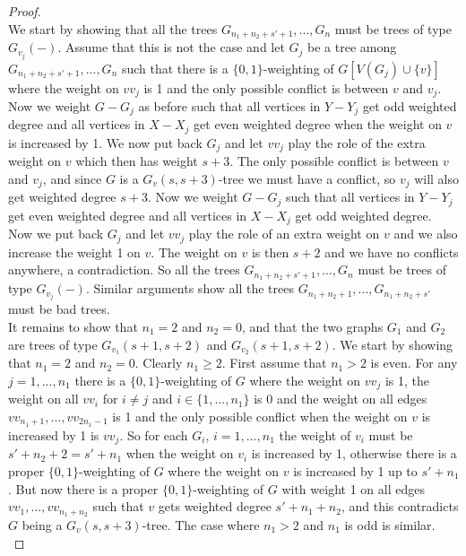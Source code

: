\documentclass[
final,
 nomarks,
]{dmtcs-episciences}
\theoremstyle{definition}
\begin{document}
\begin{proof}
\\ 
We start by showing that all the trees $G_{n_1+n_2+s'+1},...,G_n$ must be trees of type $G_{v_j}(-)$. Assume that this is not the case and let $G_j$ be a tree among $G_{n_1+n_2+s'+1},...,G_n$ such that there is a $\{0,1\}$-weighting of $G[V(G_j) \cup \{v\}]$ where the weight on $vv_j$ is 1 and the only possible conflict is between $v$ and $v_j$. Now we weight $G-G_j$ as before such that all vertices in $Y-Y_j$ get odd weighted degree and all vertices in $X-X_j$ get even weighted degree when the weight on $v$ is increased by 1. We now put back $G_j$ and let $vv_j$ play the role of the extra weight on $v$ which then has weight $s+3$. The only possible conflict is between $v$ and $v_j$, and since $G$ is a $G_v(s,s+3)$-tree we must have a conflict, so $v_j$ will also get weighted degree $s+3$. Now we weight $G-G_j$ such that all vertices in $Y-Y_j$ get even weighted degree and all vertices in $X-X_j$ get odd weighted degree. Now we put back $G_j$ and let $vv_j$ play the role of an extra weight on $v$ and we also increase the weight 1 on $v$. The weight on $v$ is then $s+2$ and we have no conflicts anywhere, a contradiction. So all the trees $G_{n_1+n_2+s'+1},...,G_n$ must be trees of type $G_{v_j}(-)$. Similar arguments show all the trees $G_{n_1+n_2+1},...,G_{n_1+n_2+s'}$ must be bad trees. \\ 
It remains to show that $n_1=2$ and $n_2=0$, and that the two graphs $G_1$ and $G_2$ are trees of type $G_{v_1}(s+1,s+2)$ and $G_{v_2}(s+1,s+2)$. We start by showing that $n_1=2$ and $n_2=0$. Clearly $n_1 \geq 2$. First assume that $n_1 >2$ is even. For any $j=1,...,n_1$ there is a $\{0,1\}$-weighting of $G$ where the weight on $vv_j$ is 1, the weight on all $vv_i$ for $i \neq j$ and $i \in \{1,...,n_1\}$ is 0 and the weight on all edges $vv_{n_1+1},..., vv_{2n_1-1}$ is 1 and the only possible conflict when the weight on $v$ is increased by 1 is $vv_j$.  So for each $G_i$, $i=1,...,n_1$ the weight of $v_i$ must be $s'+n_2+2=s'+n_1$ when the weight on $v_i$ is increased by 1, otherwise there is a proper $\{0,1\}$-weighting of $G$ where the weight on $v$ is increased by 1 up to $s'+n_1$. But now there is a proper $\{0,1\}$-weighting of $G$ with weight 1 on all edges $vv_1, ..., vv_{n_1+n_2}$ such that $v$ gets weighted degree $s'+n_1+n_2$, and this contradicts $G$ being a $G_v(s,s+3)$-tree. The case where $n_1 > 2$ and $n_1$ is odd is similar. \\

\end{proof}
\end{document}
